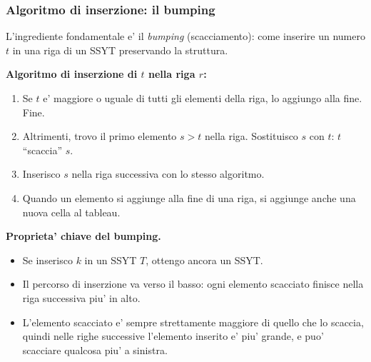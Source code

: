 \subsubsection{Algoritmo di inserzione: il bumping}

L'ingrediente fondamentale e' il \textit{bumping} (scacciamento): come inserire un numero $ t $ in una riga di un SSYT preservando la struttura.

\textbf{Algoritmo di inserzione di $ t $ nella riga $ r $:}
\begin{enumerate}
  \item Se $ t $ e' maggiore o uguale di tutti gli elementi della riga, lo aggiungo alla fine. Fine.
  \item Altrimenti, trovo il primo elemento $ s > t $ nella riga. Sostituisco $ s $ con $ t $: $ t $ ``scaccia'' $ s $.
  \item Inserisco $ s $ nella riga successiva con lo stesso algoritmo.
  \item Quando un elemento si aggiunge alla fine di una riga, si aggiunge anche una nuova cella al tableau.
\end{enumerate}

\textbf{Proprieta' chiave del bumping.}
\begin{itemize}
  \item Se inserisco $ k $ in un SSYT $ T $, ottengo ancora un SSYT.
  \item Il percorso di inserzione va verso il basso: ogni elemento scacciato finisce nella riga successiva piu' in alto.
  \item L'elemento scacciato e' sempre strettamente maggiore di quello che lo scaccia, quindi nelle righe successive l'elemento inserito e' piu' grande, e puo' scacciare qualcosa piu' a sinistra.
\end{itemize}


